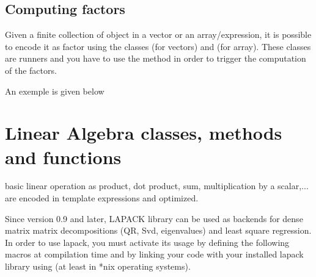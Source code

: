 \documentclass[a4paper,10pt]{article}
\begin{document}
\subsection{Computing factors}

Given a finite collection of object in a vector or an array/expression, it is possible to encode
it as factor using the classes  (for vectors) and 
(for array). These classes are runners and you have to use the  method in order to
trigger the computation of the factors.

An exemple is given below

\begin{minipage}[t]{0.66\textwidth}

\end{minipage}
\hspace{0.2cm}
\begin{minipage}[t]{0.33\textwidth}
\addtocounter{lstlisting}{-1}

\end{minipage}

\section{Linear Algebra classes, methods and functions}

\stkpp{} basic linear operation as product, dot product, sum, multiplication
by a scalar,... are encoded in template expressions and optimized.

Since \stkpp{} version 0.9 and later, LAPACK library can be used as backends for dense matrix
matrix decompositions (QR, Svd, eigenvalues) and least square regression. In order to use lapack,
you must activate its usage by defining the following macros  at
compilation time and by linking your code with your installed lapack library using 
(at least in *nix operating systems).
\end{document}
